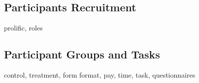 \subsection{Participants Recruitment}
prolific, roles
\subsection{Participant Groups and Tasks}
control, treatment, form format, pay, time, task, questionnaires
